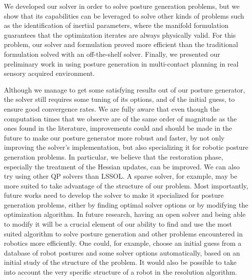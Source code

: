 We developed our solver in order to solve posture generation problems, but we show that its capabilities can be leveraged to solve other kinds of problems such as the identification of inertial parameters, where the manifold formulation guarantees that the optimization iterates are always physically valid.
For this problem, our solver and formulation proved more efficient than the traditional formulation solved with an off-the-shelf solver.
Finally, we presented our preliminary work in using posture generation in multi-contact planning in real sensory acquired environment.


Although we manage to get some satisfying results out of our posture generator, the solver still requires some tuning of its options, and of the initial guess, to ensure good convergence rates.
We are fully aware that even though the computation times that we observe are of the same order of magnitude as the ones found in the literature, improvements could and should be made in the future to make our posture generator more robust and faster, by not only improving the solver's implementation, but also specializing it for robotic posture generation problems.
In particular, we believe that the restoration phase, especially the treatment of the Hessian updates, can be improved.
We can also try using other QP solvers than LSSOL.
A sparse solver, for example, may be more suited to take advantage of the structure of our problem.
Most importantly, future works need to develop the solver to make it specialized for posture generation problems, either by finding optimal solver options or by modifying the optimization algorithm.
In future research, having an open solver and being able to modify it will be a crucial element of our ability to find and use the most suited algorithm to solve posture generation and other problems encountered in robotics more efficiently.
One could, for example, choose an initial guess from a database of robot postures and some solver options automatically, based on an initial study of the structure of the problem.
It would also be possible to take into account the very specific structure of a robot in the resolution algorithm.

